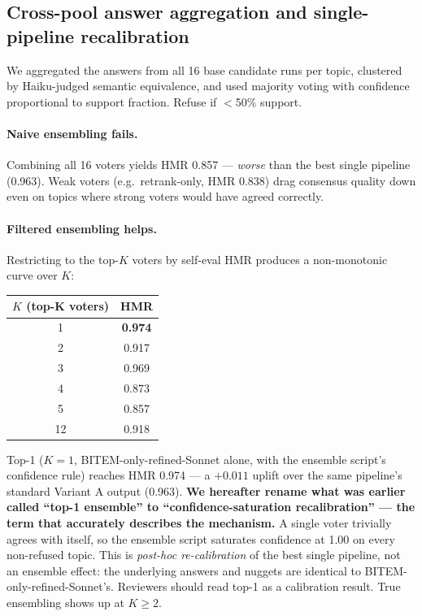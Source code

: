 \documentclass[11pt,a4paper]{article}
\newcommand{\HMR}{\textsc{HMR}}
\begin{document}
\subsection{Cross-pool answer aggregation and single-pipeline recalibration}\label{sec:rq9}

We aggregated the answers from all 16 base candidate runs per topic,
clustered by Haiku-judged semantic equivalence, and used majority
voting with confidence proportional to support fraction. Refuse if
$<$50\% support.

\paragraph{Naive ensembling fails.} Combining all 16 voters yields
\HMR{} 0.857 — \emph{worse} than the best single pipeline (0.963).
Weak voters (e.g.\ retrank-only, \HMR{} 0.838) drag consensus
quality down even on topics where strong voters would have agreed
correctly.

\paragraph{Filtered ensembling helps.} Restricting to the top-$K$
voters by self-eval \HMR{} produces a non-monotonic curve over $K$:
\begin{center}
\begin{tabular}{cc}
\toprule
$K$ (top-K voters) & \HMR \\
\midrule
1   & \textbf{0.974} \\
2   & 0.917 \\
3   & 0.969 \\
4   & 0.873 \\
5   & 0.857 \\
12  & 0.918 \\
\bottomrule
\end{tabular}
\end{center}

Top-1 ($K=1$, BITEM-only-refined-Sonnet alone, with the ensemble
script's confidence rule) reaches \HMR{} 0.974 — a $+0.011$ uplift
over the same pipeline's standard Variant A output (0.963).
\textbf{We hereafter rename what was earlier called ``top-1 ensemble''
to ``confidence-saturation recalibration'' --- the term that accurately
describes the mechanism.} A single voter trivially agrees with
itself, so the ensemble script saturates confidence at 1.00 on every
non-refused topic. This is \emph{post-hoc re-calibration} of the best
single pipeline, not an ensemble effect: the underlying answers and
nuggets are identical to BITEM-only-refined-Sonnet's. Reviewers should
read top-1 as a calibration result. True ensembling shows up at $K \geq 2$.
\end{document}
